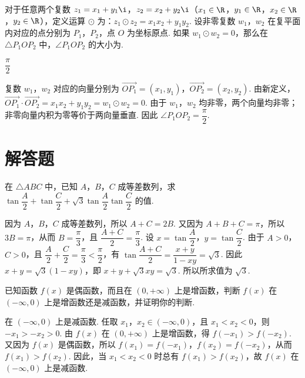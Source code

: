 \begin{problem}
对于任意两个复数 \(z_{1}=x_{1}+y_{1}\i\)，\(z_{2}=x_{2}+y_{2}\i\)（\(x_{1}\in\R\)，\(y_{1}\in\R\)，\(x_{2}\in\R\)，\(y_{2}\in\R\)），定义运算 \(\odot\) 为：\(z_{1}\odot z_{2}=x_{1}x_{2}+y_{1}y_{2}\). 设非零复数 \(w_{1}\)，\(w_{2}\) 在复平面内对应的点分别为 \(P_{1}\)，\(P_{2}\)，点 \(O\) 为坐标原点. 如果 \(w_{1}\odot w_{2}=0\)，那么在 \(\triangle P_{1}OP_{2}\) 中，\(\angle P_{1}OP_{2}\) 的大小为\fillinblank{}.
   \end{problem}

\begin{answer}
\(\dfrac{\pi}{2}\)
\end{answer}

\begin{solution}
复数 \(w_{1}\)，\(w_{2}\) 对应的向量分别为 \(\overrightarrow{OP_{1}}=(x_{1},y_{1})\)，\(\overrightarrow{OP_{2}}=(x_{2},y_{2})\). 由新定义，
\(\overrightarrow{OP_{1}}\cdot\overrightarrow{OP_{2}}=x_{1}x_{2}+y_{1}y_{2}=w_{1}\odot w_{2}=0\). 由于 \(w_{1}\)，\(w_{2}\) 均非零，两个向量均非零；非零向量内积为零等价于两向量垂直. 因此 \(\angle P_{1}OP_{2}=\dfrac{\pi}{2}\).
\end{solution}

\section{解答题}

\begin{problem}
在 \(\triangle ABC\) 中，已知 \(A\)，\(B\)，\(C\) 成等差数列，求 \(\tan\dfrac{A}{2}+\tan\dfrac{C}{2}+\sqrt{3}\tan\dfrac{A}{2}\tan\dfrac{C}{2}\) 的值.

\begin{solution}
因为 \(A\)，\(B\)，\(C\) 成等差数列，所以 \(A+C=2B\). 又因为 \(A+B+C=\pi\)，所以 \(3B=\pi\)，从而 \(B=\dfrac{\pi}{3}\)，且 \(\dfrac{A+C}{2}=\dfrac{\pi}{3}\). 设 \(x=\tan\dfrac{A}{2}\)，\(y=\tan\dfrac{C}{2}\). 由于 \(A>0\)，\(C>0\)，且 \(\dfrac{A}{2}+\dfrac{C}{2}=\dfrac{\pi}{3}<\dfrac{\pi}{2}\)，有 \(\tan\dfrac{A+C}{2}=\dfrac{x+y}{1-xy}=\sqrt{3}\). 因此 \(x+y=\sqrt{3}(1-xy)\)，即 \(x+y+\sqrt{3}xy=\sqrt{3}\). 所以所求值为 \(\sqrt{3}\).
\end{solution}
\end{problem}

\begin{problem}
已知函数 \(f(x)\) 是偶函数，而且在 \((0,+\infty)\) 上是增函数，判断 \(f(x)\) 在 \(\left(-\infty,0\right)\) 上是增函数还是减函数，并证明你的判断.

\begin{solution}
在 \(\left(-\infty,0\right)\) 上是减函数. 任取 \(x_{1}\)，\(x_{2}\in\left(-\infty,0\right)\)，且 \(x_{1}<x_{2}<0\)，则 \(-x_{1}>-x_{2}>0\). 由 \(f(x)\) 在 \((0,+\infty)\) 上是增函数，得 \(f(-x_{1})>f(-x_{2})\). 又因为 \(f(x)\) 是偶函数，所以 \(f(x_{1})=f(-x_{1})\)，\(f(x_{2})=f(-x_{2})\)，从而 \(f(x_{1})>f(x_{2})\). 因此，当 \(x_{1}<x_{2}<0\) 时总有 \(f(x_{1})>f(x_{2})\)，故 \(f(x)\) 在 \(\left(-\infty,0\right)\) 上是减函数.
\end{solution}
\end{problem}

